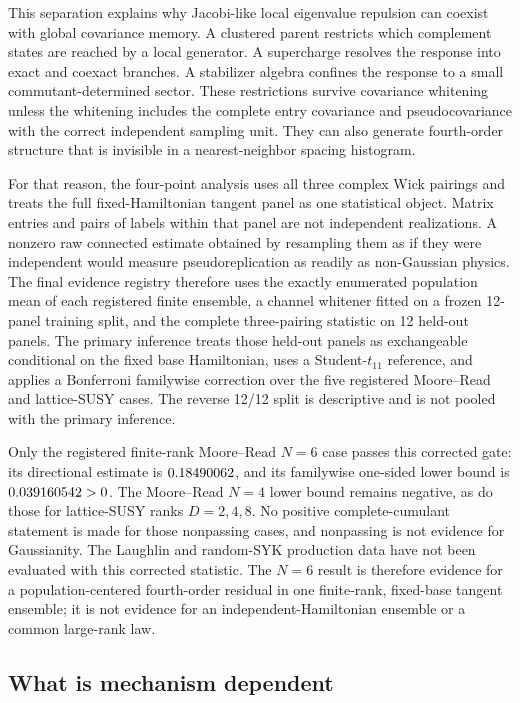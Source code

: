 This separation explains why Jacobi-like local eigenvalue repulsion can
coexist with global covariance memory.  A clustered parent restricts which
complement states are reached by a local generator.  A supercharge resolves
the response into exact and coexact branches.  A stabilizer algebra confines
the response to a small commutant-determined sector.  These restrictions
survive covariance whitening unless the whitening includes the complete entry
covariance and pseudocovariance with the correct independent sampling unit.
They can also generate fourth-order structure that is invisible in a
nearest-neighbor spacing histogram.

For that reason, the four-point analysis uses all three complex Wick pairings
and treats the full fixed-Hamiltonian tangent panel as one statistical object.
Matrix entries and pairs of labels within that panel are not independent
realizations.  A nonzero raw connected estimate obtained by resampling them as
if they were independent would measure pseudoreplication as readily as
non-Gaussian physics. The final evidence registry therefore uses the exactly enumerated population mean of each registered finite ensemble, a channel whitener fitted on a frozen 12-panel training split, and the complete three-pairing statistic on 12 held-out panels. The primary inference treats those held-out panels as exchangeable conditional on the fixed base Hamiltonian, uses a Student-$t_{11}$ reference, and applies a Bonferroni familywise correction over the five registered Moore--Read and lattice-SUSY cases. The reverse 12/12 split is descriptive and is not pooled with the primary inference.

Only the registered finite-rank Moore--Read $N=6$ case passes this corrected gate: its directional estimate is $0.18490062$, and its familywise one-sided lower bound is $0.039160542>0$. The Moore--Read $N=4$ lower bound remains negative, as do those for lattice-SUSY ranks $D=2,4,8$. No positive complete-cumulant statement is made for those nonpassing cases, and nonpassing is not evidence for Gaussianity. The Laughlin and random-SYK production data have not been evaluated with this corrected statistic. The $N=6$ result is therefore evidence for a population-centered fourth-order residual in one finite-rank, fixed-base tangent ensemble; it is not evidence for an independent-Hamiltonian ensemble or a common large-rank law.

\subsection{What is mechanism dependent}

